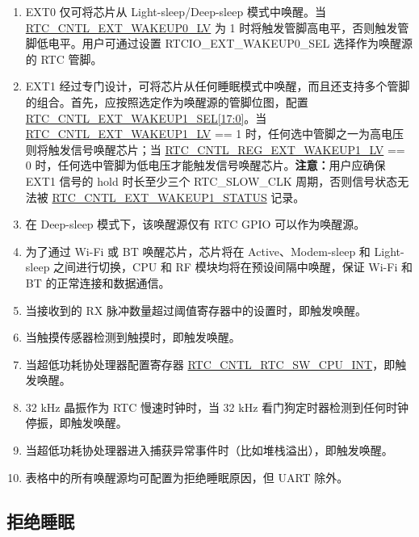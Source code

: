 \documentclass[main\_\_CN.tex]{subfiles}
\begin{document}
\begin{tiplisting}
\vspace{-2em}
\begin{enumerate}
\item \label{wakeup-sources-note1}EXT0 仅可将芯片从 Light-sleep/Deep-sleep 模式中唤醒。当 \hyperref[fielddesc:RTCCNTLEXTWAKEUP0LV]{RTC\_CNTL\_EXT\_WAKEUP0\_LV} 为 1 时将触发管脚高电平，否则触发管脚低电平。用户可通过设置 RTCIO\_EXT\_WAKEUP0\_SEL 选择作为唤醒源的 RTC 管脚。
\item \label{wakeup-sources-note2}EXT1 经过专门设计，可将芯片从任何睡眠模式中唤醒，而且还支持多个管脚的组合。首先，应按照选定作为唤醒源的管脚位图，配置 \hyperref[fielddesc:RTCCNTLEXTWAKEUP1SEL]{RTC\_CNTL\_EXT\_WAKEUP1\_SEL[17:0]}。当 \hyperref[fielddesc:RTCCNTLEXTWAKEUP1LV]{RTC\_CNTL\_EXT\_WAKEUP1\_LV} == 1 时，任何选中管脚之一为高电压则将触发信号唤醒芯片；当 \hyperref[fielddesc:RTCCNTLEXTWAKEUP1LV]{RTC\_CNTL\_REG\_EXT\_WAKEUP1\_LV} == 0 时，任何选中管脚为低电压才能触发信号唤醒芯片。{\bfseries 注意：}用户应确保 EXT1 信号的 hold 时长至少三个 RTC\_SLOW\_CLK 周期，否则信号状态无法被 \hyperref[regdesc:RTCCNTLRTCEXTWAKEUP1STATUSREG]{RTC\_CNTL\_EXT\_WAKEUP1\_STATUS} 记录。
\item \label{wakeup-sources-note3}在 Deep-sleep 模式下，该唤醒源仅有 RTC GPIO 可以作为唤醒源。
\item \label{wakeup-sources-note4}为了通过 Wi-Fi 或 BT 唤醒芯片，芯片将在 Active、Modem-sleep 和 Light-sleep 之间进行切换，CPU 和 RF 模块均将在预设间隔中唤醒，保证 Wi-Fi 和 BT 的正常连接和数据通信。
\item \label{wakeup-sources-note5}当接收到的 RX 脉冲数量超过阈值寄存器中的设置时，即触发唤醒。
\item \label{wakeup-sources-note6}当触摸传感器检测到触摸时，即触发唤醒。
\item \label{wakeup-sources-note7}当超低功耗协处理器配置寄存器  \hyperref[fielddesc:RTCCNTLRTCSWCPUINT]{RTC\_CNTL\_RTC\_SW\_CPU\_INT}，即触发唤醒。
\item \label{wakeup-sources-note8}32 kHz 晶振作为 RTC 慢速时钟时，当 32 kHz 看门狗定时器检测到任何时钟停振，即触发唤醒。
\item \label{wakeup-sources-note9}当超低功耗协处理器进入捕获异常事件时（比如堆栈溢出），即触发唤醒。
\item \label{wakeup-sources-note10}表格中的所有唤醒源均可配置为拒绝睡眠原因，但 UART 除外。
\end{enumerate}
\end{tiplisting}
\subsection{拒绝睡眠}\label{sec:lpm-reject-source}
\end{document}
